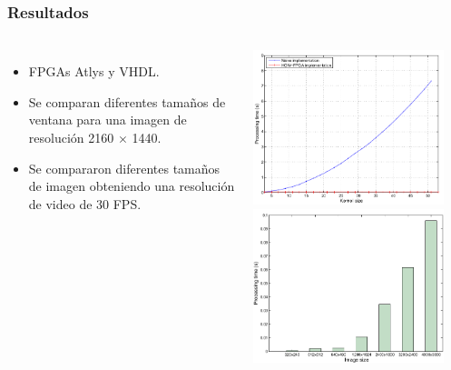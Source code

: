 \frame
{
\frametitle{Resultados}
\begin{columns}
\begin{itemize}
\item FPGAs Atlys y VHDL.

\item Se comparan diferentes tamaños de ventana para una imagen de resolución 2160 $\times$ 1440.
\item Se compararon diferentes tamaños de imagen obteniendo una resolución de video de 30 FPS.
\end{itemize}

    \includegraphics[width=0.9\textwidth]{Figs/2014_Arq_Umbralizacion03}\\
    \includegraphics[width=0.9\textwidth]{Figs/2014_Arq_Umbralizacion04}

\end{columns}}
